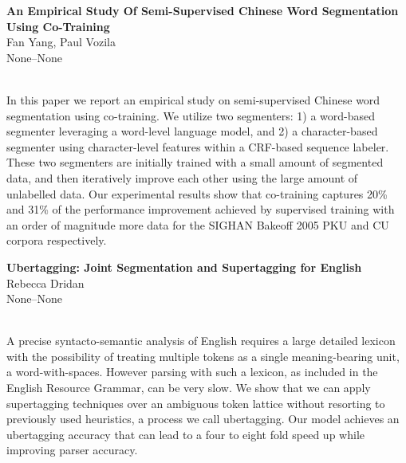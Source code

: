\documentclass[twoside,makeidx]{book}
\begin{document}
\par\vspace{2em}\noindent%
\begin{minipage}{\linewidth}%
\begin{center}
\textbf{\normalsize An Empirical Study Of Semi-Supervised Chinese Word Segmentation Using Co-Training}\\
\normalsize  Fan Yang,  Paul Vozila\\
{\small None--None}\\
\end{center}
\end{minipage}\\[0.5em]
\nopagebreak%
\noindent%
{\small In this paper we report an empirical study on semi-supervised Chinese word segmentation using co-training.  We utilize two segmenters: 1) a word-based segmenter leveraging a word-level language model, and 2) a character-based segmenter using character-level features within a CRF-based sequence labeler.  These two segmenters are initially trained with a small amount of segmented data, and then iteratively improve each other using the large amount of unlabelled data.  Our experimental results show that co-training captures 20\% and 31\% of the performance improvement achieved by supervised training with an order of magnitude more data for the SIGHAN Bakeoff 2005 PKU and CU corpora respectively.}
\par\vspace{2em}\noindent%
\begin{minipage}{\linewidth}%
\begin{center}
\textbf{\normalsize Ubertagging: Joint Segmentation and Supertagging for English}\\
\normalsize  Rebecca Dridan\\
{\small None--None}\\
\end{center}
\end{minipage}\\[0.5em]
\nopagebreak%
\noindent%
{\small A precise syntacto-semantic analysis of English requires a large detailed lexicon with the possibility of treating multiple tokens as a single meaning-bearing unit, a word-with-spaces. However parsing with such a lexicon, as included in the English Resource Grammar, can be very slow. We show that we can apply supertagging techniques over an ambiguous token lattice without resorting to previously used heuristics, a process we call ubertagging. Our model achieves an ubertagging accuracy that can lead to a four to eight fold speed up while improving parser accuracy.}
\end{document}
